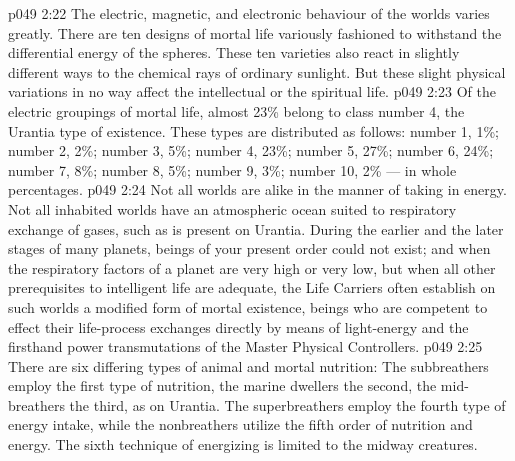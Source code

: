 \vs p049 2:22 \bibnobreakspace {} The electric, magnetic, and electronic behaviour of the worlds varies greatly. There are ten designs of mortal life variously fashioned to withstand the differential energy of the spheres. These ten varieties also react in slightly different ways to the chemical rays of ordinary sunlight. But these slight physical variations in no way affect the intellectual or the spiritual life.
\vs p049 2:23 Of the electric groupings of mortal life, almost 23\% belong to class number 4, the Urantia type of existence. These types are distributed as follows: number 1, 1\%; number 2, 2\%; number 3, 5\%; number 4, 23\%; number 5, 27\%; number 6, 24\%; number 7, 8\%; number 8, 5\%; number 9, 3\%; number 10, 2\% --- in whole percentages.
\vs p049 2:24 \bibnobreakspace {} Not all worlds are alike in the manner of taking in energy. Not all inhabited worlds have an atmospheric ocean suited to respiratory exchange of gases, such as is present on Urantia. During the earlier and the later stages of many planets, beings of your present order could not exist; and when the respiratory factors of a planet are very high or very low, but when all other prerequisites to intelligent life are adequate, the Life Carriers often establish on such worlds a modified form of mortal existence, beings who are competent to effect their life\hyp{}process exchanges directly by means of light\hyp{}energy and the firsthand power transmutations of the Master Physical Controllers.
\vs p049 2:25 There are six differing types of animal and mortal nutrition: The subbreathers employ the first type of nutrition, the marine dwellers the second, the mid\hyp{}breathers the third, as on Urantia. The superbreathers employ the fourth type of energy intake, while the nonbreathers utilize the fifth order of nutrition and energy. The sixth technique of energizing is limited to the midway creatures.
